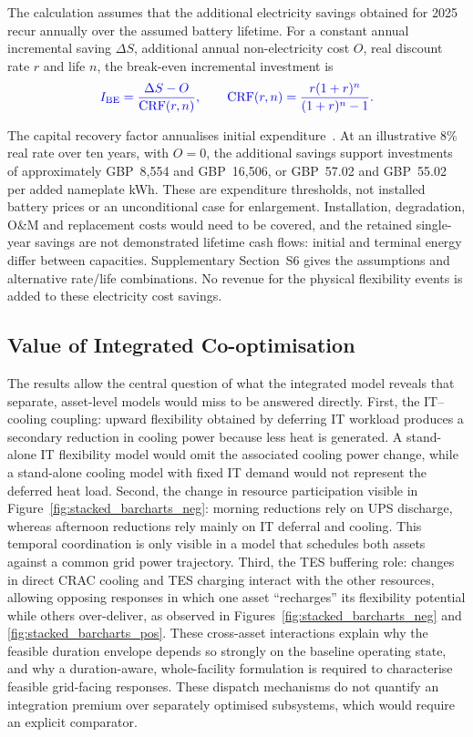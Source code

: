 \documentclass[lettersize,journal]{IEEEtran}
\providecommand{\DIFadd}[1]{{\color{blue}#1}}
\begin{document}
\DIFadd{The calculation assumes that the additional electricity savings obtained for 2025 recur annually over the assumed battery lifetime. For a constant annual incremental saving $\Delta S$, additional annual non-electricity cost $O$, real discount rate $r$ and life $n$, the break-even incremental investment is
}\begin{equation}
\DIFadd{I_{\mathrm{BE}}=\frac{\Delta S-O}{\mathrm{CRF}(r,n)},\qquad
\mathrm{CRF}(r,n)=\frac{r(1+r)^n}{(1+r)^n-1}.
\label{eq:ups-investment}
}\end{equation}
\DIFadd{The capital recovery factor annualises initial expenditure~\cite{sam_crf}. At an illustrative 8\% real rate over ten years, with $O=0$, the additional savings support investments of approximately GBP~8,554 and GBP~16,506, or GBP~57.02 and GBP~55.02 per added nameplate kWh. These are expenditure thresholds, not installed battery prices or an unconditional case for enlargement. Installation, degradation, O\&M and replacement costs would need to be covered, and the retained single-year savings are not demonstrated lifetime cash flows: initial and terminal energy differ between capacities. Supplementary Section~S6 gives the assumptions and alternative rate/life combinations. No revenue for the physical flexibility events is added to these electricity cost savings.

}


\subsection{\DIFadd{Value of Integrated Co-optimisation}}\label{sec:integration-value}
\DIFadd{The results allow the central question of what the integrated model reveals that separate, asset-level models would miss to be answered directly. First, the IT--cooling coupling: upward flexibility obtained by deferring IT workload produces a secondary reduction in cooling power because less heat is generated. A stand-alone IT flexibility model would omit the associated cooling power change, while a stand-alone cooling model with fixed IT demand would not represent the deferred heat load. Second, the change in resource participation visible in Figure~\ref{fig:stacked_barcharts_neg}: morning reductions rely on UPS discharge, whereas afternoon reductions rely mainly on IT deferral and cooling. This temporal coordination is only visible in a model that schedules both assets against a common grid power trajectory. Third, the TES buffering role: changes in direct CRAC cooling and TES charging interact with the other resources, allowing opposing responses in which one asset ``recharges'' its flexibility potential while others over-deliver, as observed in Figures~\ref{fig:stacked_barcharts_neg} and \ref{fig:stacked_barcharts_pos}. These cross-asset interactions explain why the feasible duration envelope depends so strongly on the baseline operating state, and why a duration-aware, whole-facility formulation is required to characterise feasible grid-facing responses. These dispatch mechanisms do not quantify an integration premium over separately optimised subsystems, which would require an explicit comparator.

}
\end{document}

